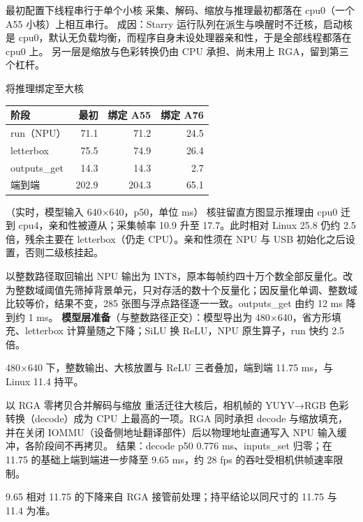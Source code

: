 \documentclass[aspectratio=169,fontset=mac]{ctexbeamer}
\newcommand{\hdr}[1]{\textsf{\bfseries\color{ink}#1}}
\newcommand{\headrow}{\rowcolor{tinthdr}}
\newcommand{\keyline}[1]{\par\vskip3pt\noindent\colorbox{tintbox}{\parbox{0.91\textwidth}{\color{ink}#1}}\par}
\begin{document}
\begin{frame}{最初配置下线程串行于单个小核}
采集、解码、缩放与推理最初都落在 cpu0（一个 A55 小核）上相互串行。
\vskip6pt
成因：Starry 运行队列在派生与唤醒时不迁核，启动核是 cpu0，默认无负载均衡，而程序自身未设处理器亲和性，于是全部线程都落在 cpu0 上。
\vskip6pt
\footnotesize 另一层是缩放与色彩转换仍由 CPU 承担、尚未用上 RGA，留到第三个杠杆。
\end{frame}

\begin{frame}{将推理绑定至大核}
\small
\begin{tabular}{@{}lrrr@{}}
\toprule
\headrow \hdr{阶段} & \hdr{最初} & \hdr{绑定 A55} & \hdr{绑定 A76}\\
\midrule
run（NPU）& 71.1 & 71.2 & 24.5\\
letterbox & 75.5 & 74.9 & 26.4\\
outputs\_get & 14.3 & 14.3 & 2.7\\
端到端 & 202.9 & 204.3 & 65.1\\
\bottomrule
\end{tabular}
\hfill（实时，模型输入 640×640，p50，单位 ms）
\vskip5pt
\small 核驻留直方图显示推理由 cpu0 迁到 cpu4，亲和性被遵从；采集帧率 10.9 升至 17.7。此时相对 Linux 25.8 仍约 2.5 倍，残余主要在 letterbox（仍走 CPU）。亲和性须在 NPU 与 USB 初始化之后设置，否则二级核挂起。
\end{frame}

\begin{frame}{以整数路径取回输出}
\small
NPU 输出为 INT8，原本每帧约四十万个数全部反量化。改为整数域阈值先筛掉背景单元，只对存活的数十个反量化；因反量化单调、整数域比较等价，结果不变，285 张图与浮点路径逐一一致。outputs\_get 由约 12 ms 降到约 1 ms。
\vskip5pt
\textbf{模型层准备}（与整数路径正交）：模型导出为 480×640，省方形填充、letterbox 计算量随之下降；SiLU 换 ReLU，NPU 原生算子，run 快约 2.5 倍。
\keyline{480×640 下，整数输出、大核放置与 ReLU 三者叠加，端到端 11.75 ms，与 Linux 11.4 持平。}
\end{frame}

\begin{frame}{以 RGA 零拷贝合并解码与缩放}
\small
重活迁往大核后，相机帧的 YUYV→RGB 色彩转换（decode）成为 CPU 上最高的一项。RGA 同时承担 decode 与缩放填充，并在关闭 IOMMU（设备侧地址翻译部件）后以物理地址直通写入 NPU 输入缓冲，各阶段间不再拷贝。
\vskip5pt
结果：decode p50 0.776 ms、inputs\_set 归零；在 11.75 的基础上端到端进一步降至 9.65 ms，约 28 fps 的吞吐受相机供帧速率限制。
\keyline{9.65 相对 11.75 的下降来自 RGA 接管前处理；持平结论以同尺寸的 11.75 与 11.4 为准。}
\end{frame}
\end{document}
